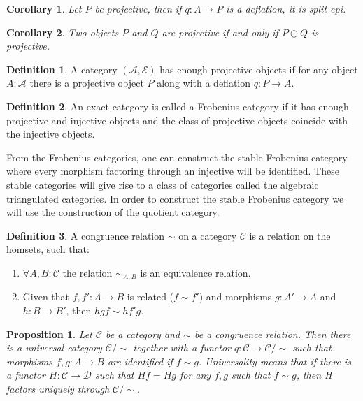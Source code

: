 \documentclass[12pt]{article}
\newtheorem{corollary}{Corollary}[theorem]
\newtheorem{prop}[theorem]{Proposition}
\theoremstyle{definition}
\newtheorem{definition}{Definition}[section]
\theoremstyle{remark}
\begin{document}
            \begin{corollary}
                Let $P$ be projective, then if $q:A\rightarrow P$ is a deflation, it is split-epi.
            \end{corollary}

            \begin{corollary}
                Two objects $P$ and $Q$ are projective if and only if $P\oplus Q$ is projective.
            \end{corollary}

            \begin{definition}
                A category $(\mathcal{A}, \mathcal{E})$ has enough projective objects if for any object $A:\mathcal{A}$ there is a projective object $P$ along with a deflation $q:P\rightarrow A$.
            \end{definition}

            \begin{definition}
                An exact category is called a Frobenius category if it has enough projective and injective objects and the class of projective objects coincide with the injective objects.
            \end{definition}

            From the Frobenius categories, one can construct the stable Frobenius category where every morphism factoring through an injective will be identified. These stable categories will give rise to a class of categories called the algebraic triangulated categories. In order to construct the stable Frobenius category we will use the construction of the quotient category.

            \begin{definition}
                A congruence relation $\sim$ on a category $\mathcal{C}$ is a relation on the homsets, such that:
                \begin{enumerate}
                    \item $\forall A,B:\mathcal{C}$ the relation $\sim_{A,B}$ is an equivalence relation.
                    \item Given that $f,f':A\rightarrow B$ is related ($f\sim f'$) and morphisms $g:A'\rightarrow A$ and $h:B\rightarrow B'$, then $hgf\sim hf'g$.
                \end{enumerate}
            \end{definition}

            \begin{prop}
                Let $\mathcal{C}$ be a category and $\sim$ be a congruence relation. Then there is a universal category $\mathcal{C}/\sim$ together with a functor $q:\mathcal{C}\rightarrow \mathcal{C}/\sim$ such that morphisms $f,g:A\rightarrow B$ are identified if $f\sim g$. Universality means that if there is a functor $H:\mathcal{C}\rightarrow \mathcal{D}$ such that $Hf=Hg$ for any $f,g$ such that $f\sim g$, then H factors uniquely through $\mathcal{C}/\sim$.
            \end{prop}
\end{document}

